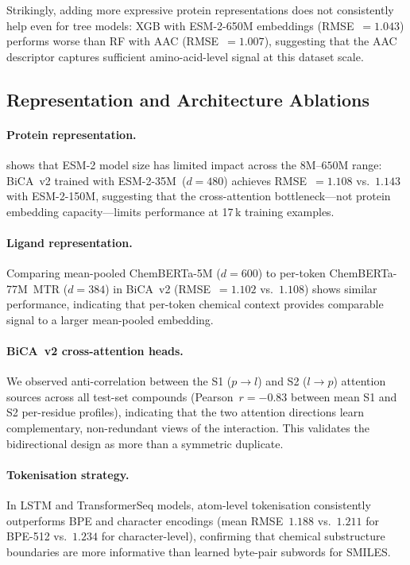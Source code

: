 \documentclass[11pt,twocolumn]{article}
\begin{document}
Strikingly, adding more expressive protein representations does not
consistently help even for tree models: XGB with ESM-2-650M
embeddings (RMSE~$=1.043$) performs worse than RF with AAC (RMSE~$=1.007$),
suggesting that the AAC descriptor captures sufficient amino-acid-level
signal at this dataset scale.

\subsection{Representation and Architecture Ablations}

\paragraph{Protein representation.}
 shows that ESM-2 model size has limited impact
across the $8\text{M}$--$650\text{M}$ range: BiCA~v2 trained with
ESM-2-35M~($d=480$) achieves RMSE~$=1.108$ vs.~$1.143$ with ESM-2-150M,
suggesting that the cross-attention bottleneck---not protein embedding
capacity---limits performance at 17\,k training examples.

\paragraph{Ligand representation.}
Comparing mean-pooled ChemBERTa-5M ($d=600$) to per-token
ChemBERTa-77M~MTR ($d=384$) in BiCA~v2 (RMSE~$=1.102$ vs.~$1.108$) shows
similar performance, indicating that per-token chemical context provides
comparable signal to a larger mean-pooled embedding.

\paragraph{BiCA~v2 cross-attention heads.}
We observed anti-correlation between the S1 ($p\to l$) and S2 ($l\to p$)
attention sources across all test-set compounds (Pearson~$r=-0.83$ between
mean S1 and S2 per-residue profiles), indicating that the two attention
directions learn complementary, non-redundant views of the interaction.
This validates the bidirectional design as more than a symmetric duplicate.

\paragraph{Tokenisation strategy.}
In LSTM and TransformerSeq models, atom-level tokenisation consistently
outperforms BPE and character encodings (mean RMSE~$1.188$ vs.~$1.211$
for BPE-512 vs.~$1.234$ for character-level), confirming that chemical
substructure boundaries are more informative than learned byte-pair subwords
for SMILES.
\end{document}
